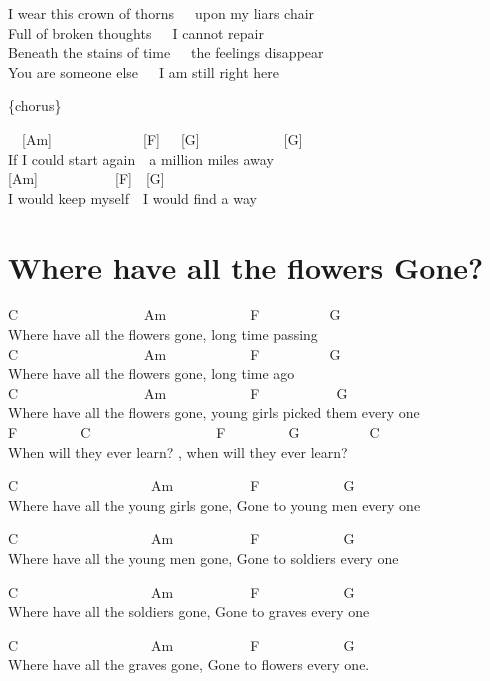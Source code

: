 \documentclass[
  letterpaper,
  a5paper]{memoir}
\begin{document}
I wear this crown of thorns~~~upon my liar\textquotesingle s chair\\
Full of broken thoughts~~~I cannot repair\\
Beneath the stains of time~~~the feelings disappear\\
You are someone else~~~I am still right here

\{chorus\}

~~{[}Am{]}~~~~~~~~~~~~~{[}F{]}~~~{[}G{]}~~~~~~~~~~~~{[}G{]}\\
If I could start again~~a million miles away\\
{[}Am{]}~~~~~~~~~~~{[}F{]}~~{[}G{]}\\
I would keep myself~~I would find a way

\hypertarget{where-have-all-the-flowers-gone}{%
\chapter{Where have all the flowers
Gone?}\label{where-have-all-the-flowers-gone}}

C~~~~~~~~~~~~~~~~~~Am~~~~~~~~~~~~F~~~~~~~~~~G\\
Where have all the flowers gone, long time passing\\
C~~~~~~~~~~~~~~~~~~Am~~~~~~~~~~~~F~~~~~~~~~~G\\
Where have all the flowers gone, long time ago\\
C~~~~~~~~~~~~~~~~~~Am~~~~~~~~~~~~F~~~~~~~~~~~G\\
Where have all the flowers gone, young girls picked them every one\\
F~~~~~~~~~C~~~~~~~~~~~~~~~~~~F~~~~~~~~~G~~~~~~~~~~C~~~\\
When will they ever learn? , when will they ever learn?

C~~~~~~~~~~~~~~~~~~~Am~~~~~~~~~~~F~~~~~~~~~~~~G\\
Where have all the young girls gone, Gone to young men every one

C~~~~~~~~~~~~~~~~~~~Am~~~~~~~~~~~F~~~~~~~~~~~~G\\
Where have all the young men gone, Gone to soldiers every one

C~~~~~~~~~~~~~~~~~~~Am~~~~~~~~~~~F~~~~~~~~~~~~G~~~\\
Where have all the soldiers gone, Gone to graves every one

C~~~~~~~~~~~~~~~~~~~Am~~~~~~~~~~~F~~~~~~~~~~~~G~~\\
Where have all the graves gone, Gone to flowers every one.
\end{document}
